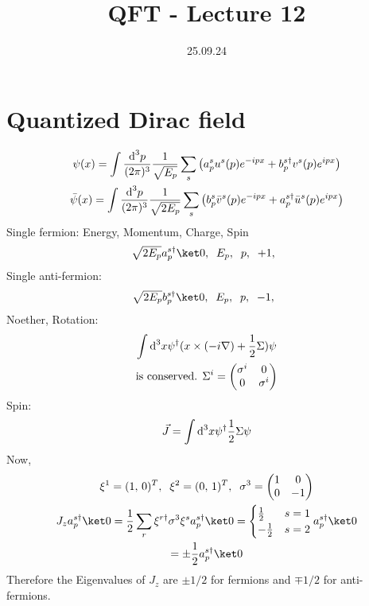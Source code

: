 \documentclass[]{scrartcl}
\title{QFT - Lecture 12}
\author{}
\date{25.09.24}
\begin{document}
\maketitle
\newpage
\tableofcontents
\newpage

\section{Quantized Dirac field} 
 
\begin{gather}
	\psi(x) = \int\frac{\text d^3p}{(2\pi)^3}\frac{1}{\sqrt{E_p}}\sum_s \left(a_p^s u^s(p) e^{-ipx} + b_p^{s\dagger}v^s(p)e^{ipx}\right)\\
	\bar\psi(x) = \int\frac{\text d^3p}{(2\pi)^3}\frac{1}{\sqrt{2E_p}}\sum_s\left(b_p^s \bar v^{s}(p) e^{-ipx} + a_p^{s\dagger}\bar u^s(p)e^{ipx}\right)
\end{gather}
Single fermion: Energy, Momentum, Charge, Spin
\begin{equation}
	\sqrt{2E_p}a_p^{s\dagger}\ket0,\;\; E_p,\;\; p,\;\; +1,\;\;
\end{equation}
Single anti-fermion:
\begin{equation}
	\sqrt{2E_p}b_p^{s\dagger}\ket0,\;\; E_p,\;\; p,\;\; -1,\;\;
\end{equation}
Noether, Rotation:
\begin{gather}
	\int \text d^3x \psi^\dagger(x\times(-i\nabla) + \frac{1}{2}\Sigma)\psi\\
	\text{is conserved. }\Sigma^i =
	\begin{pmatrix}
		\sigma^i & 0 \\ 0 & \sigma^i
	\end{pmatrix}
\end{gather}
Spin:
\begin{equation}
	\vec J = \int \text d^3x \psi^\dagger \frac{1}{2}\Sigma\psi
\end{equation}
Now,
\begin{gather}
	\xi^1 = (1,\,0)^T,\;\; \xi^2 = (0,\,1)^T,\;\; \sigma^3 = 
	\begin{pmatrix}
		1 & 0 \\ 0 & -1
	\end{pmatrix}\\
	J_z a_p^{s\dagger}\ket 0 = \frac{1}{2}\sum_r \xi^{r\dagger}\sigma^3\xi^s a_p^{s\dagger}\ket 0 = 
	\begin{cases}
		\frac{1}{2} & s=1\\
		-\frac{1}{2} & s = 2
	\end{cases} a_p^{s\dagger}\ket 0\\
	= \pm \frac{1}{2}a_p^{s\dagger}\ket 0
\end{gather}
Therefore the Eigenvalues of $J_z$ are $\pm1/2$ for fermions and $\mp1/2$ for anti-fermions.
\end{document}
